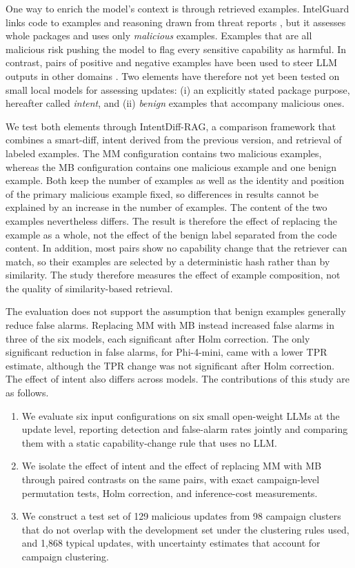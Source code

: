 \documentclass[a4paper,fleqn]{cas-dc}
\begin{document}
One way to enrich the model's context is through retrieved examples. IntelGuard
links code to examples and reasoning drawn from threat reports
\citep{guo2026bridging}, but it assesses whole packages and uses only
\emph{malicious} examples. Examples that are all malicious risk pushing the model
to flag every sensitive capability as harmful. In contrast, pairs of positive and
negative examples have been used to steer LLM outputs in other domains
\citep{gao2024customizing}. Two elements have therefore not yet been tested on
small local models for assessing updates: (i) an explicitly stated package
purpose, hereafter called \emph{intent}, and (ii) \emph{benign} examples that
accompany malicious ones.

We test both elements through IntentDiff-RAG, a comparison framework that
combines a smart-diff, intent derived from the previous version, and
retrieval of labeled examples. The MM configuration contains two
malicious examples, whereas the MB configuration contains one malicious example
and one benign example. Both keep the number of examples as well as the identity
and position of the primary malicious example fixed, so differences in results
cannot be explained by an increase in the number of examples. The content of the
two examples nevertheless differs. The result is therefore the effect of
replacing the example as a whole, not the effect of the benign label separated
from the code content. In addition, most pairs show no capability change that
the retriever can match, so their examples are selected by a deterministic hash
rather than by similarity. The study therefore measures the effect of example
composition, not the quality of similarity-based retrieval.

The evaluation does not support the assumption that benign examples generally
reduce false alarms. Replacing MM with MB instead increased false alarms in three
of the six models, each significant after Holm correction. The only
significant reduction in false alarms, for Phi-4-mini, came with a lower TPR
estimate, although the TPR change was not significant after Holm correction. The
effect of intent also differs across models. The contributions of this study are
as follows.
\begin{enumerate}
\item We evaluate six input configurations on six small open-weight LLMs at the
update level, reporting detection and false-alarm rates jointly and comparing
them with a static capability-change rule that uses no LLM.
\item We isolate the effect of intent and the effect of replacing MM with MB
through paired contrasts on the same pairs, with exact campaign-level
permutation tests, Holm correction, and inference-cost measurements.
\item We construct a test set of 129 malicious updates from 98 campaign clusters
that do not overlap with the development set under the clustering rules used,
and 1,868 typical updates, with uncertainty estimates that account for campaign
clustering.
\end{enumerate}
\end{document}
